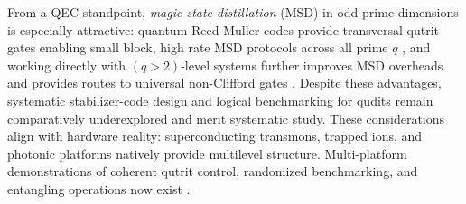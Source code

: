 From a QEC standpoint, \emph{magic-state distillation} (MSD) in odd prime dimensions is especially attractive: quantum Reed Muller codes provide transversal qutrit gates enabling small block, high rate MSD protocols across all prime \(q\) \cite{CampbellPRX2012}, and working directly with \((q>2)\)-level systems further improves MSD overheads and provides routes to universal non-Clifford gates \cite{CampbellPRL2014}. Despite these advantages, systematic stabilizer-code design and logical benchmarking for qudits remain comparatively underexplored and merit systematic study. These considerations align with hardware reality: superconducting transmons, trapped ions, and photonic platforms natively provide multilevel structure.  Multi-platform demonstrations of coherent qutrit control, randomized benchmarking, and entangling operations now exist \cite{Morvan2021,Ringbauer2022,Goss2024}.

